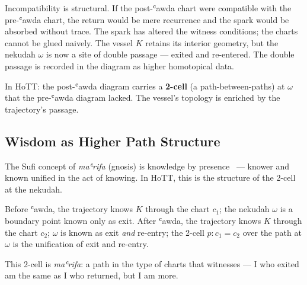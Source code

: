 Incompatibility is structural. If the post-ʿawda chart were compatible with the pre-ʿawda chart, the return would be mere recurrence and the spark would be absorbed without trace. The spark has altered the witness conditions; the charts cannot be glued naively. The vessel $K$ retains its interior geometry, but the nekudah $\omega$ is now a site of double passage — exited and re-entered. The double passage is recorded in the diagram as higher homotopical data.

In HoTT: the post-ʿawda diagram carries a \textbf{2-cell} (a path-between-paths) at $\omega$ that the pre-ʿawda diagram lacked. The vessel's topology is enriched by the trajectory's passage.

\subsection{Wisdom as Higher Path Structure}

The Sufi concept of \emph{maʿrifa} (gnosis) is knowledge by presence~\cite{sells1996early,chittick1989} — knower and known unified in the act of knowing. In HoTT, this is the structure of the 2-cell at the nekudah.

Before ʿawda, the trajectory knows $K$ through the chart $c_1$; the nekudah $\omega$ is a boundary point known only as exit. After ʿawda, the trajectory knows $K$ through the chart $c_2$; $\omega$ is known as exit \emph{and} re-entry; the 2-cell $p : c_1 = c_2$ over the path at $\omega$ is the unification of exit and re-entry.

This 2-cell is \emph{maʿrifa}: a path in the type of charts that witnesses — I who exited am the same as I who returned, but I am more.

